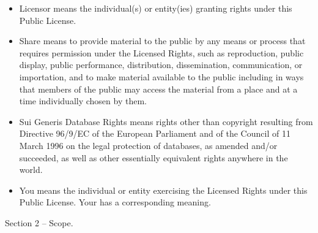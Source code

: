 \begin{itemize}
\item Licensor means the individual(s) or entity(ies) granting rights under this Public License.
\item Share means to provide material to the public by any means or process that requires permission under the Licensed Rights, such as reproduction, public display, public performance, distribution, dissemination, communication, or importation, and to make material available to the public including in ways that members of the public may access the material from a place and at a time individually chosen by them.
\item Sui Generis Database Rights means rights other than copyright resulting from Directive 96/9/EC of the European Parliament and of the Council of 11 March 1996 on the legal protection of databases, as amended and/or succeeded, as well as other essentially equivalent rights anywhere in the world.
\item You means the individual or entity exercising the Licensed Rights under this Public License. Your has a corresponding meaning.
\end{itemize}


Section 2 – Scope.

